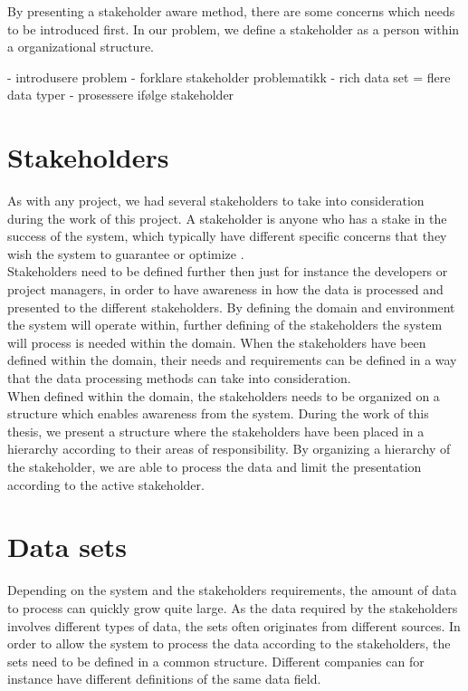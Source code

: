 By presenting a stakeholder aware method, there are some concerns which needs
to be introduced first. In our problem, we define a stakeholder as a person
within a organizational structure. 

- introdusere problem
- forklare stakeholder problematikk
- rich data set = flere data typer
- prosessere ifølge stakeholder


\section{Stakeholders} %
\label{sec:intro_stakeholders}  
As with any project, we had several stakeholders to take into consideration
during the work of this project. A stakeholder is anyone who has a stake in 
the success of the system, which typically have different specific concerns 
that they wish the system to guarantee or optimize 
\cite{Bass:2012:SAP:2392670}.\\

Stakeholders need to be defined further then just for instance the developers
or project managers, in order to have awareness in how the data is processed 
and presented to the different stakeholders. 
By defining the domain and environment the system will
operate within, further defining of the stakeholders the system will process 
is needed within the domain. When the stakeholders have been defined within 
the domain, their needs and requirements can be defined in a way that the data 
processing methods can take into consideration. \\

When defined within the domain, the stakeholders needs to be organized on a 
structure which enables awareness from the system. During the work of this 
thesis, we present a structure where the stakeholders have been placed in a 
hierarchy according to their areas of responsibility. By organizing a 
hierarchy of the stakeholder, we are able to process the data and limit the 
presentation according to the active stakeholder. 

\section{Data sets} %
\label{sec:intro_data_sets}
Depending on the system and the stakeholders requirements, the amount of data
to process can quickly grow quite large. As the data required by the
stakeholders involves different types of data, the sets often originates from
different sources. In order to allow the system to process the data according
to the stakeholders, the sets need to be defined in a common structure.
Different companies can for instance have different definitions of the same
data field.


